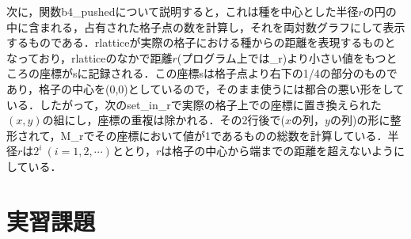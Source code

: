 \documentclass{jsarticle}
\begin{document}
        次に，関数b4\_pushedについて説明すると，これは種を中心とした半径$r$の円の中に含まれる，占有された格子点の数を計算し，それを両対数グラフにして表示するものである．rlatticeが実際の格子における種からの距離を表現するものとなっており，rlatticeのなかで距離$r$(プログラム上では\_r)より小さい値をもつところの座標がsに記録される．この座標sは格子点より右下の1/4の部分のものであり，格子の中心を(0,0)としているので，そのまま使うには都合の悪い形をしている．したがって，次のset\_in\_rで実際の格子上での座標に置き換えられた$(x,y)$の組にし，座標の重複は除かれる．その2行後で($x$の列，$y$の列)の形に整形されて，M\_rでその座標において値が1であるものの総数を計算している．半径$r$は$2^i\ (i=1, 2, \cdots)$ととり，$r$は格子の中心から端までの距離を超えないようにしている．
        
        
\section{実習課題}
\end{document}
